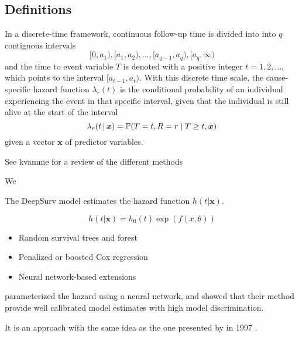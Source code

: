 \subsection{Definitions}

In a discrete-time framework, 
continuous follow-up time is divided into into \(q\) contiguous intervals
%
\begin{equation*}
	[0, a_1), [a_1, a_2), ..., [a_{q-1}, a_q), [a_{q}, \infty)
\end{equation*}
%
and the time to event variable \(T\) is denoted 
with a positive integer \(t = 1, 2, ...\),
which points to the interval \([a_{t-1}, a_{t})\).
With this discrete time scale,
the cause-specific hazard function \(\lambda_{r}(t)\) is 
the conditional probability of an individual experiencing 
the event in that specific interval,
given that the individual is still alive at the start of the interval
%
\begin{equation}
    \lambda_{r}(t \,|\, \bm{x}) = \operatorname{\mathbb{P}} (T = t, R = r \mid T \geq t, \bm{x})
\end{equation}
%
given a vector \(\bm{x}\) of predictor variables. 







See kvamme for a review of the different methods




\vspace{10em}

We 

The DeepSurv model estimates the hazard function \(h(t|\mathbf{x})\).

\begin{equation}
    h(t | \mathbf{x}) = h_0(t) \exp(f(x, \theta))
\end{equation}

\begin{itemize}
    \item Random survival trees and forest
    \item Penalized or boosted Cox regression
    \item Neural network-based extensions
\end{itemize}




\citeauthor{gensheimerScalable2019} 
parameterized the hazard using a neural network,
and showed that their method provide well calibrated
model estimates with high model discrimination.

It is an approach with the same idea as the one presented by 
\citeauthor{brownUse1997} in 1997 \autocite{brownUse1997}.



